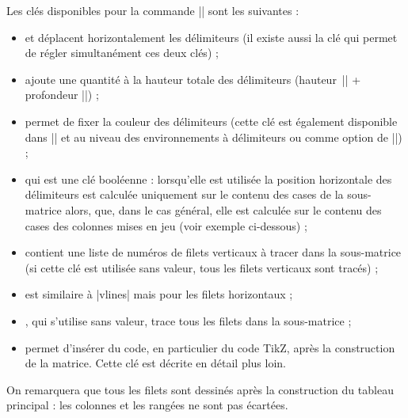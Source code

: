\documentclass[dvipsnames]{article}
\begin{document}
\bigskip
Les clés disponibles pour la commande |\SubMatrix| sont les suivantes :
%
\begin{itemize}[beginpenalty=10000]
\item 
{}
 et  déplacent
horizontalement les délimiteurs (il existe aussi la clé  qui
permet de régler simultanément ces deux clés) ;
\item {}
 ajoute une quantité à la hauteur totale des
délimiteurs (hauteur~|\ht| + profondeur |\dp|) ;
\item {}
 permet de fixer la couleur des délimiteurs (cette clé
est également disponible dans |\NiceMatrixOptions| et au niveau des
environnements à délimiteurs ou comme option de |\CodeAfter|) ;
\item {}
 qui est une clé booléenne : lorsqu'elle est utilisée la position
horizontale des délimiteurs est calculée uniquement sur le contenu des cases
de la sous-matrice alors, que, dans le cas général, elle est calculée sur le
contenu des cases des colonnes mises en jeu (voir exemple ci-dessous) ;
\item {}
 contient une liste de numéros de filets verticaux à tracer dans
la sous-matrice (si cette clé est utilisée sans valeur, tous les filets
verticaux sont tracés) ;
\item {}
 est similaire à |vlines| mais pour les filets horizontaux ;
\item {}
, qui s'utilise sans valeur, trace tous les filets dans la
sous-matrice ;
\item {}
 permet d'insérer du code, en particulier du code TikZ, après la
construction de la matrice. Cette clé est décrite en détail plus loin.
\end{itemize}
On remarquera que tous les filets sont dessinés après la construction du tableau
principal : les colonnes et les rangées ne sont pas écartées.
\end{document}
